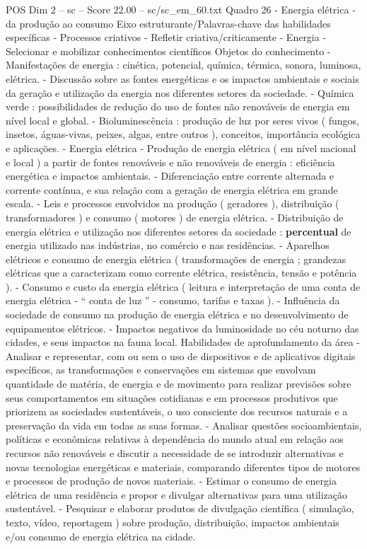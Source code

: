\begin{textsample}{POS Dim 2 – sc – Score 22.00 – sc/sc\_em\_60.txt}
Quadro 26 - Energia elétrica - da produção ao consumo Eixo estruturante/Palavras-chave das habilidades específicas - Processos criativos - Refletir criativa/criticamente - Energia - Selecionar e mobilizar conhecimentos científicos Objetos do conhecimento - Manifestações de energia : cinética, potencial, química, térmica, sonora, luminosa, elétrica. - Discussão sobre as fontes energéticas e os impactos ambientais e sociais da geração e utilização da energia nos diferentes setores da sociedade. - Química verde : possibilidades de redução do uso de fontes não renováveis de energia em nível local e global. - Bioluminescência : produção de luz por seres vivos ( fungos, insetos, águas-vivas, peixes, algas, entre outros ), conceitos, importância ecológica e aplicações. - Energia elétrica - Produção de energia elétrica ( em nível nacional e local ) a partir de fontes renováveis e não renováveis de energia : eficiência energética e impactos ambientais. - Diferenciação entre corrente alternada e corrente contínua, e sua relação com a geração de energia elétrica em grande escala. - Leis e processos envolvidos na produção ( geradores ), distribuição ( transformadores ) e consumo ( motores ) de energia elétrica. - Distribuição de energia elétrica e utilização nos diferentes setores da sociedade : \textbf{percentual} de energia utilizado nas indústrias, no comércio e nas residências. - Aparelhos elétricos e consumo de energia elétrica ( transformações de energia ; grandezas elétricas que a caracterizam como corrente elétrica, resistência, tensão e potência ). - Consumo e custo da energia elétrica ( leitura e interpretação de uma conta de energia elétrica - “ conta de luz ” - consumo, tarifas e taxas ). - Influência da sociedade de consumo na produção de energia elétrica e no desenvolvimento de equipamentos elétricos. - Impactos negativos da luminosidade no céu noturno das cidades, e seus impactos na fauna local.
Habilidades de aprofundamento da área - Analisar e representar, com ou sem o uso de dispositivos e de aplicativos digitais específicos, as transformações e conservações em sistemas que envolvam quantidade de matéria, de energia e de movimento para realizar previsões sobre seus comportamentos em situações cotidianas e em processos produtivos que priorizem as sociedades sustentáveis, o uso consciente dos recursos naturais e a preservação da vida em todas as suas formas. - Analisar questões socioambientais, políticas e econômicas relativas à dependência do mundo atual em relação aos recursos não renováveis e discutir a necessidade de se introduzir alternativas e novas tecnologias energéticas e materiais, comparando diferentes tipos de motores e processos de produção de novos materiais. - Estimar o consumo de energia elétrica de uma residência e propor e divulgar alternativas para uma utilização sustentável. - Pesquisar e elaborar produtos de divulgação científica ( simulação, texto, vídeo, reportagem ) sobre produção, distribuição, impactos ambientais e/ou consumo de energia elétrica na cidade.

\end{textsample}
